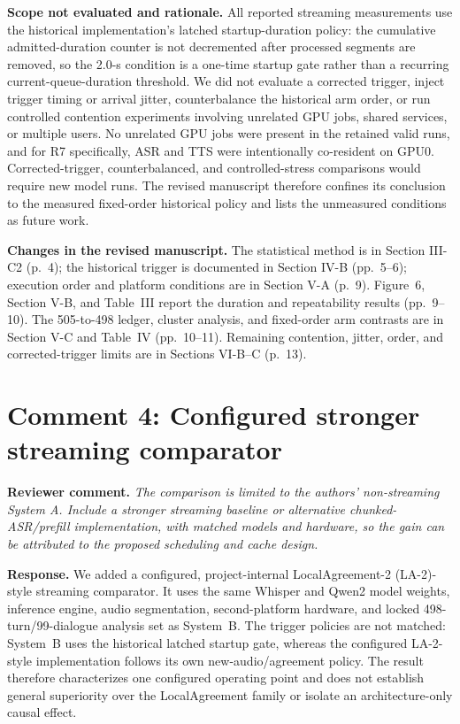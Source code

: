 \documentclass[11pt]{article}
\newcommand{\reviewcomment}[1]{\vspace{0.4em}\noindent\textbf{Reviewer comment.} \emph{#1}}
\newcommand{\response}{\vspace{0.25em}\noindent\textbf{Response.} }
\newcommand{\scope}{\vspace{0.25em}\noindent\textbf{Scope not evaluated and rationale.} }
\newcommand{\changes}{\vspace{0.25em}\noindent\textbf{Changes in the revised manuscript.} }
\begin{document}
\scope All reported streaming measurements use the historical implementation's latched startup-duration policy: the cumulative admitted-duration counter is not decremented after processed segments are removed, so the 2.0-s condition is a one-time startup gate rather than a recurring current-queue-duration threshold. We did not evaluate a corrected trigger, inject trigger timing or arrival jitter, counterbalance the historical arm order, or run controlled contention experiments involving unrelated GPU jobs, shared services, or multiple users. No unrelated GPU jobs were present in the retained valid runs, and for R7 specifically, ASR and TTS were intentionally co-resident on GPU0. Corrected-trigger, counterbalanced, and controlled-stress comparisons would require new model runs. The revised manuscript therefore confines its conclusion to the measured fixed-order historical policy and lists the unmeasured conditions as future work.

\changes The statistical method is in Section III-C2 (p.~4); the historical trigger is documented in Section IV-B (pp.~5--6); execution order and platform conditions are in Section V-A (p.~9). Figure~6, Section V-B, and Table~III report the duration and repeatability results (pp.~9--10). The 505-to-498 ledger, cluster analysis, and fixed-order arm contrasts are in Section V-C and Table~IV (pp.~10--11). Remaining contention, jitter, order, and corrected-trigger limits are in Sections VI-B--C (p.~13).

\section*{Comment 4: Configured stronger streaming comparator}

\reviewcomment{The comparison is limited to the authors' non-streaming System A. Include a stronger streaming baseline or alternative chunked-ASR/prefill implementation, with matched models and hardware, so the gain can be attributed to the proposed scheduling and cache design.}

\response We added a configured, project-internal LocalAgreement-2 (LA-2)-style streaming comparator. It uses the same Whisper and Qwen2 model weights, inference engine, audio segmentation, second-platform hardware, and locked 498-turn/99-dialogue analysis set as System~B. The trigger policies are not matched: System~B uses the historical latched startup gate, whereas the configured LA-2-style implementation follows its own new-audio/agreement policy. The result therefore characterizes one configured operating point and does not establish general superiority over the LocalAgreement family or isolate an architecture-only causal effect.
\end{document}
